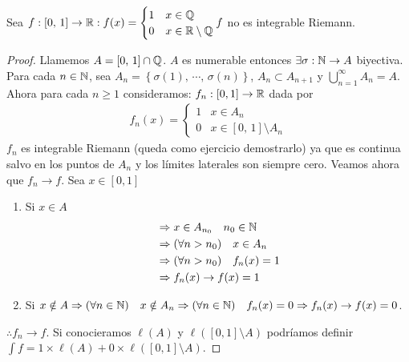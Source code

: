 \begin{eg}
    Sea \(f: [0 \text{, } 1] \to \mathbb{R} : f(x) = \begin{cases}
            1 & x \in \mathbb{Q}              \\
            0 & x \in \mathbb{R} \setminus \mathbb{Q}
        \end{cases} f\) no es integrable Riemann.
    \begin{proof}
        Llamemos \(A = [0 \text{, } 1] \cap \mathbb{Q}\). \(A\) es numerable entonces \(\exists \sigma: \mathbb{N} \to A\) biyectiva. Para cada \(n \in \mathbb{N}\), sea
        \(A_n = \left\{ \sigma(1)\text{, } \cdots \text{, } \sigma(n) \right\}\), \(A_n \subset A_{n+1}\) y \(\bigcup_{n=1}^{\infty} A_n = A\).
        Ahora para cada \(n \geq 1\) consideramos:
        \(f_n: [0, 1] \to \mathbb{R}\) dada por
        \begin{align*}
            f_n(x) = \begin{cases}
                         1 & x \in A_n                          \\
                         0 & x \in [0\text{, } 1] \setminus A_n
                     \end{cases}
        \end{align*}
        \(f_n\) es integrable Riemann (queda como ejercicio demostrarlo) ya que es continua salvo en los puntos de \(A_n\) y
        los límites laterales son siempre cero.
        Veamos ahora que \(f_n \to f\). Sea \(x \in [0, 1]\) \begin{enumerate}
            \item Si \(x \in A\) \begin{align*}
                       & \Rightarrow x \in A_{n_0} \quad n_0 \in \mathbb{N}     \\
                       & \Rightarrow (\forall n > n_0) \quad x \in A_n  \\
                       & \Rightarrow (\forall n > n_0) \quad f_n(x) = 1 \\
                       & \Rightarrow f_n(x) \to f(x) = 1
                  \end{align*}
            \item Si \(x \notin A \Rightarrow (\forall n \in \mathbb{N}) \quad x \notin A_n \Rightarrow (\forall n \in \mathbb{N}) \quad f_n(x) = 0 \Rightarrow f_n(x) \to f(x) = 0\).
        \end{enumerate} \(\therefore f_n \to f\).
        Si conocieramos \(\ell(A)\) y \(\ell([0, 1] \setminus A)\) podríamos definir \(\int f = 1 \times \ell(A) + 0 \times \ell([0, 1] \setminus A)\).
    \end{proof}
\end{eg}

